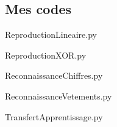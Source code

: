 \subsection{Mes codes}

\begin{frame}[fragile]{ReproductionLineaire.py}
    
\end{frame}


\begin{frame}[fragile]{ReproductionXOR.py}
    
\end{frame}

\begin{frame}[fragile]{ReconnaissanceChiffres.py}
    
\end{frame}


\begin{frame}[fragile]{ReconnaissanceVetements.py}
    
\end{frame}


\begin{frame}[fragile]{TransfertApprentissage.py}
    
\end{frame}